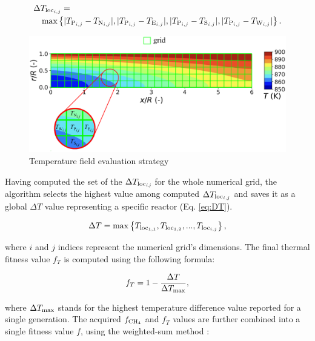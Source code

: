 \documentclass[preprint,12pt]{elsarticle}
\begin{document}
\begin{eqnarray} 
\label{eq:DT_loc}
\begin{multlined}
\Delta T_{{\rm{loc}}_{i,j}} = \\ {\rm{max}}\left\{|T_{{\rm{P}}_{i,j}} - T_{{\rm{N}}_{i,j}}|, |T_{{\rm{P}}_{i,j}} - T_{{\rm{E}}_{i,j}}|, |T_{{\rm{P}}_{i,j}} - T_{{\rm{S}}_{i,j}}|, |T_{{\rm{P}}_{i,j}} - T_{{\rm{W}}_{i,j}}|\right\}.
 \end{multlined}
 \end{eqnarray}

\begin{figure}[h]
\centering
\includegraphics[width=130mm]{thermal_fitness.eps}\hspace{2pc}
\caption{\label{fig:f_T} Temperature field evaluation strategy}
\end{figure}

Having computed the set of the $\Delta T_{\rm{loc}_{\textit{i,j}}}$ for the whole numerical grid, the algorithm selects the highest value among computed $\Delta T_{{\rm{loc}}_{i,j}}$ and saves it as a global $\Delta T$ value representing a specific reactor (Eq. \eqref{eq:DT}).

\begin{equation}
\label{eq:DT}
\Delta T = {\rm{max}}\left\{ T_{{\rm{loc}}_{1,1}}, T_{{\rm{loc}}_{1,2}}, ... , T_{{\rm{loc}}_{i,j}}\right\},
\end{equation}

\noindent where $i$ and $j$ indices represent the numerical grid's dimensions. The final thermal fitness value $f_T$ is computed using the following formula: 

\begin{equation}
f_T = 1 - \frac{\Delta T}{\Delta T_{\rm{max}}},
\label{eq:T_fit}
\end{equation}

\noindent where $\Delta T_{\rm{max}}$ stands for the highest temperature difference value reported for a single generation. The acquired $f_{\rm{CH_4}}$ and $f_T$ values are further combined into a single fitness value $f$, using the weighted-sum method \cite{Zitzler1999}:
\end{document}
